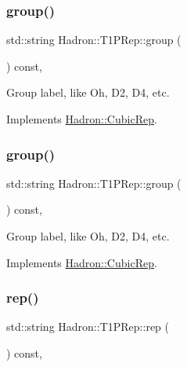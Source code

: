 \subsubsection{\texorpdfstring{group()}{group()}\hspace{0.1cm}{\footnotesize\ttfamily [2/3]}}
{\footnotesize\ttfamily std\+::string Hadron\+::\+T1\+P\+Rep\+::group (\begin{DoxyParamCaption}{ }\end{DoxyParamCaption}) const\hspace{0.3cm}{\ttfamily [inline]}, {\ttfamily [virtual]}}

Group label, like Oh, D2, D4, etc. 

Implements \mbox{\hyperlink{structHadron_1_1CubicRep_a0748f11ec87f387062c8e8981339a29c}{Hadron\+::\+Cubic\+Rep}}.

\mbox{\label{structHadron_1_1T1PRep_a9e319545acc323df42a4668547bac994}} 
\subsubsection{\texorpdfstring{group()}{group()}\hspace{0.1cm}{\footnotesize\ttfamily [3/3]}}
{\footnotesize\ttfamily std\+::string Hadron\+::\+T1\+P\+Rep\+::group (\begin{DoxyParamCaption}{ }\end{DoxyParamCaption}) const\hspace{0.3cm}{\ttfamily [inline]}, {\ttfamily [virtual]}}

Group label, like Oh, D2, D4, etc. 

Implements \mbox{\hyperlink{structHadron_1_1CubicRep_a0748f11ec87f387062c8e8981339a29c}{Hadron\+::\+Cubic\+Rep}}.

\mbox{\label{structHadron_1_1T1PRep_abf59dcb0de05bb6acf26b43d0dd5e281}} 
\subsubsection{\texorpdfstring{rep()}{rep()}\hspace{0.1cm}{\footnotesize\ttfamily [1/3]}}
{\footnotesize\ttfamily std\+::string Hadron\+::\+T1\+P\+Rep\+::rep (\begin{DoxyParamCaption}{ }\end{DoxyParamCaption}) const\hspace{0.3cm}{\ttfamily [inline]}, {\ttfamily [virtual]}}

